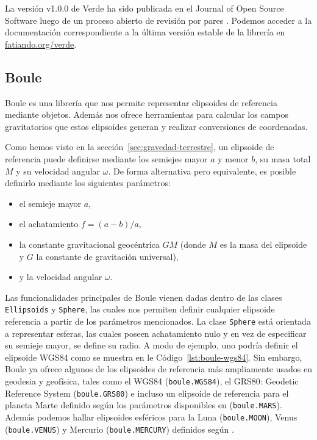 La versión v1.0.0 de Verde ha sido publicada en el Journal of Open
Source Software luego de un proceso abierto de revisión por pares
\citep{verde2018}.
Podemos acceder a la documentación correspondiente a la última versión estable
de la librería en \href{https://www.fatiando.org/verde}{fatiando.org/verde}.


\subsection{Boule}
\label{sec:boule}

Boule es una librería que nos permite representar elipsoides de
referencia mediante objetos. Además nos ofrece herramientas para calcular los
campos gravitatorios que estos elipsoides generan y realizar conversiones
de coordenadas.

Como hemos visto en la sección~\ref{sec:gravedad-terrestre}, un elipsoide de
referencia puede definirse mediante los semiejes mayor $a$ y menor $b$, su masa
total $M$ y su velocidad angular $\omega$.
De forma alternativa pero equivalente, es posible definirlo mediante los
siguientes parámetros:

\begin{itemize}
    \item el semieje mayor $a$,
    \item el achatamiento $f = (a - b) / a$,
    \item la constante gravitacional geocéntrica $GM$ (donde $M$ es la masa
        del elipsoide y $G$ la constante de gravitación universal),
    \item y la velocidad angular $\omega$.
\end{itemize}

Las funcionalidades principales de Boule vienen dadas dentro de las clases
\texttt{Ellipsoids} y \texttt{Sphere}, las cuales nos permiten definir
cualquier elipsoide referencia a partir de los parámetros mencionados.
La clase \texttt{Sphere} está orientada a representar esferas, las cuales
poseen achatamiento nulo y en vez de especificar su semieje mayor, se define su
radio.
A modo de ejemplo, uno podría definir el elipsoide WGS84 como se muestra en le
Código~\ref{lst:boule-wgs84}.
Sin embargo, Boule ya ofrece algunos de los elipsoides de referencia más
ampliamente usados en geodesia y geofísica, tales como el WGS84
(\texttt{boule.WGS84}), el GRS80: Geodetic Reference System
(\texttt{boule.GRS80}) e incluso un elipsoide de referencia para el planeta
Marte definido según los parámetros disponibles en \citet{ardalan2009}
(\texttt{boule.MARS}).
Además podemos hallar elipsoides esféricos para la Luna (\texttt{boule.MOON}),
Venus (\texttt{boule.VENUS}) y Mercurio (\texttt{boule.MERCURY}) definidos
según \citet{wieczorek2015}.


